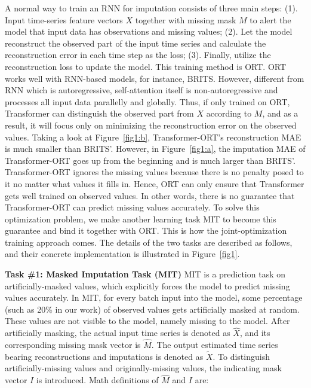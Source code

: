 \documentclass{article}
\begin{document}
A normal way to train an RNN for imputation consists of three main steps: (1). Input time-series feature vectors $X$ together with missing mask $M$ to alert the model that input data has observations and missing values; (2). Let the model reconstruct the observed part of the input time series and calculate the reconstruction error in each time step as the loss; (3). Finally, utilize the reconstruction loss to update the model. This training method is ORT. ORT works well with RNN-based models, for instance, BRITS. However, different from RNN which is autoregressive, self-attention itself is non-autoregressive and processes all input data parallelly and globally. Thus, if only trained on ORT, Transformer can distinguish the observed part from $X$ according to $M$, and as a result, it will focus only on minimizing the reconstruction error on the observed values. Taking a look at Figure~\ref{fig1:b}, Transformer-ORT's reconstruction MAE is much smaller than BRITS'. However, in Figure~\ref{fig1:a}, the imputation MAE of Transformer-ORT goes up from the beginning and is much larger than BRITS'. Transformer-ORT ignores the missing values because there is no penalty posed to it no matter what values it fills in. Hence, ORT can only ensure that Transformer gets well trained on observed values. In other words, there is no guarantee that Transformer-ORT can predict missing values accurately. To solve this optimization problem, we make another learning task MIT to become this guarantee and bind it together with ORT. This is how the joint-optimization training approach comes. The details of the two tasks are described as follows, and their concrete implementation is illustrated in Figure~\ref{fig1}.

\textbf{Task \#1: Masked Imputation Task (MIT)} \hspace{1em}
MIT is a prediction task on artificially-masked values, which explicitly forces the model to predict missing values accurately. In MIT, for every batch input into the model, some percentage (such as 20\% in our work) of observed values gets artificially masked at random. These values are not visible to the model, namely missing to the model. After artificially masking, the actual input time series is denoted as $\hat{X}$, and its corresponding missing mask vector is $\hat{M}$. The output estimated time series bearing reconstructions and imputations is denoted as $\tilde{X}$. To distinguish artificially-missing values and originally-missing values, the indicating mask vector $I$ is introduced. Math definitions of $\hat{M}$ and $I$ are: 
\end{document}
